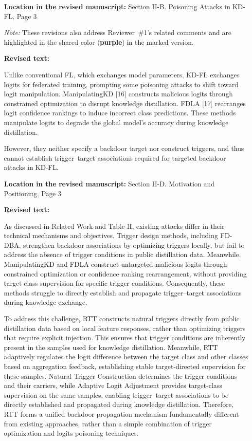 \documentclass[11pt,a4paper]{article}
\newcommand{\manualindent}{\par\noindent\hspace*{1.5em}\ignorespaces}
\newcommand{\revisedtext}[2]{%
  {\bfseries\color{headingnavy}Location in the revised manuscript:} #1\par
  \begin{tcolorbox}[
      enhanced,breakable,colback=replyblue!3,colframe=replyblue!18,
      before upper={\setlength{\parskip}{6pt}},
      borderline west={2.5pt}{0pt}{replyblue},
      boxrule=0.5pt,arc=1mm,left=11pt,right=9pt,top=8pt,bottom=8pt]
    {\bfseries\color{headingnavy}Revised text:}\par
    #2
  \end{tcolorbox}
  \vspace{0.35em}%
}
\begin{document}
\revisedtext{Section II-B. Poisoning Attacks in KD-FL, Page 3 \par \noindent \textit{Note:} These revisions also address Reviewer~\#1's related comments and are highlighted in the shared color (\textcolor{share}{\textbf{purple}}) in the marked version.}{\manualindent Unlike conventional FL, which exchanges model parameters, KD-FL exchanges logits for federated training, prompting some poisoning attacks to shift toward logit manipulation.
ManipulatingKD [16] constructs malicious logits through constrained optimization to disrupt knowledge distillation.
FDLA [17] rearranges logit confidence rankings to induce incorrect class predictions.
These methods manipulate logits to degrade the global model's accuracy during knowledge distillation. 

\manualindent However, they neither specify a backdoor target nor construct triggers, and thus cannot establish trigger–target associations required for targeted backdoor attacks in KD-FL.}

\revisedtext{Section II-D. Motivation and Positioning, Page 3}{\manualindent As discussed in Related Work and Table II, existing attacks differ in their technical mechanisms and objectives.
Trigger design methods, including FD-DBA, strengthen backdoor associations by optimizing triggers locally, but fail to address the absence of trigger conditions in public distillation data.
Meanwhile, ManipulatingKD and FDLA construct untargeted malicious logits through constrained optimization or confidence ranking rearrangement, without providing target-class supervision for specific trigger conditions.
Consequently, these methods struggle to directly establish and propagate trigger--target associations during knowledge exchange.

\manualindent To address this challenge, RTT constructs natural triggers directly from public distillation data based on local feature responses, rather than optimizing triggers that require explicit injection.
This ensures that trigger conditions are inherently present in the samples used for knowledge distillation.
Meanwhile, RTT adaptively regulates the logit difference between the target class and other classes based on aggregation feedback, establishing stable target-directed supervision for these samples.
Natural Trigger Construction determines the trigger conditions and their carriers, while Adaptive Logit Adjustment provides target-class supervision on the same samples, enabling trigger--target associations to be directly established and propagated during knowledge distillation.
Therefore, RTT forms a unified backdoor propagation mechanism fundamentally different from existing approaches, rather than a simple combination of trigger optimization and logits poisoning techniques.}
\end{document}
